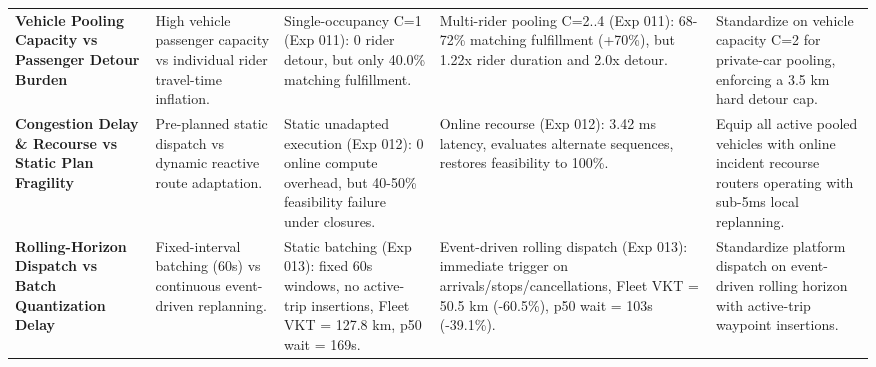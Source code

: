 \begin{table}[t]
\begin{tabularx}{\textwidth}{l p{3.2cm} p{3.2cm} p{3.2cm} p{3.8cm}}
\textbf{Vehicle Pooling Capacity vs Passenger Detour Burden} & High vehicle passenger capacity vs individual rider travel-time inflation. & Single-occupancy C=1 (Exp 011): 0 rider detour, but only 40.0\% matching fulfillment. & Multi-rider pooling C=2..4 (Exp 011): 68-72\% matching fulfillment (+70\%), but 1.22x rider duration and 2.0x detour. & Standardize on vehicle capacity C=2 for private-car pooling, enforcing a 3.5 km hard detour cap. \\
\textbf{Congestion Delay \& Recourse vs Static Plan Fragility} & Pre-planned static dispatch vs dynamic reactive route adaptation. & Static unadapted execution (Exp 012): 0 online compute overhead, but 40-50\% feasibility failure under closures. & Online recourse (Exp 012): 3.42 ms latency, evaluates alternate sequences, restores feasibility to 100\%. & Equip all active pooled vehicles with online incident recourse routers operating with sub-5ms local replanning. \\
\textbf{Rolling-Horizon Dispatch vs Batch Quantization Delay} & Fixed-interval batching (60s) vs continuous event-driven replanning. & Static batching (Exp 013): fixed 60s windows, no active-trip insertions, Fleet VKT = 127.8 km, p50 wait = 169s. & Event-driven rolling dispatch (Exp 013): immediate trigger on arrivals/stops/cancellations, Fleet VKT = 50.5 km (-60.5\%), p50 wait = 103s (-39.1\%). & Standardize platform dispatch on event-driven rolling horizon with active-trip waypoint insertions. \\
\bottomrule
\end{tabularx}
\end{table}
